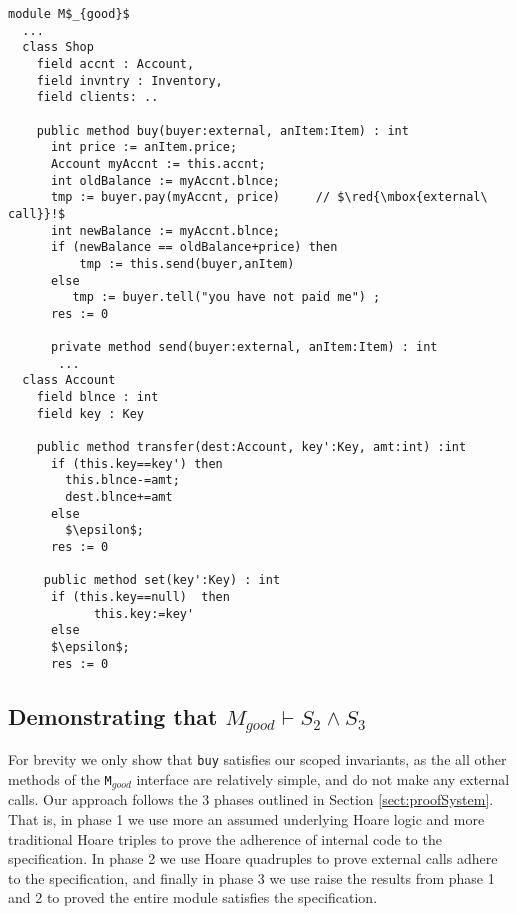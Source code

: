 \begin{lstlisting}[mathescape=true, language=Chainmail, frame=lines]
module M$_{good}$
  ...   
  class Shop
    field accnt : Account, 
    field invntry : Inventory, 
    field clients: ..
  
    public method buy(buyer:external, anItem:Item) : int
      int price := anItem.price;
      Account myAccnt := this.accnt;
      int oldBalance := myAccnt.blnce;
      tmp := buyer.pay(myAccnt, price)     // $\red{\mbox{external\ call}}!$
      int newBalance := myAccnt.blnce;
      if (newBalance == oldBalance+price) then
          tmp := this.send(buyer,anItem)
      else
         tmp := buyer.tell("you have not paid me") ; 
      res := 0
     
      private method send(buyer:external, anItem:Item) : int
       ... 
  class Account
    field blnce : int 
    field key : Key
    
    public method transfer(dest:Account, key':Key, amt:int) :int
      if (this.key==key') then
        this.blnce-=amt;
        dest.blnce+=amt
      else
        $\epsilon$;
      res := 0
	  
     public method set(key':Key) : int
      if (this.key==null)  then
      		this.key:=key'
      else 
	  $\epsilon$;
      res := 0
\end{lstlisting}

\subsection{Demonstrating that $M_{good} \vdash S_2 \wedge S_3$}
 \label{s:app:example:proofs}
 
For brevity we only show that \verb|buy| satisfies our scoped invariants, as the all other methods of 
the \verb|M|$_{good}$ interface are relatively simple, and do not make any external calls. 
Our approach follows the 3 phases outlined in Section \ref{sect:proofSystem}. That is, in
phase 1 we use more an assumed underlying Hoare logic and more traditional Hoare triples to prove the adherence of internal code to
the specification. In phase 2 we use Hoare quadruples to prove external calls adhere
to the specification, and finally in phase 3 we use raise the results from phase 1 and 2 to proved
the entire module satisfies the specification.


